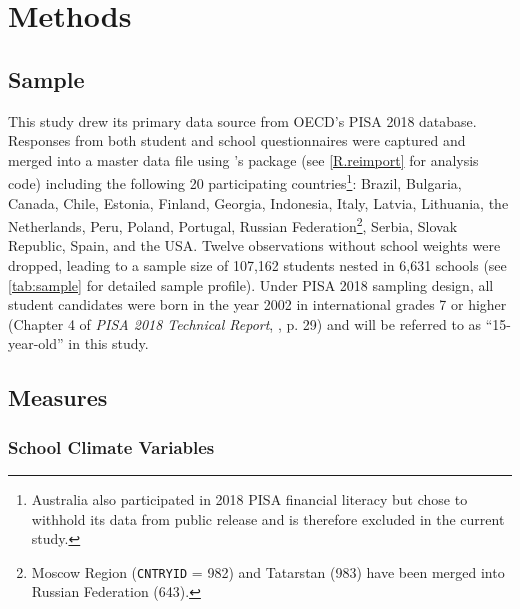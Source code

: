 \documentclass[a4paper,11pt,UKenglish,twoside,openright]{report}\usepackage[]{graphicx}\usepackage[]{color}
\begin{document}

\chapter{Methods}
\label{chp:3}

\section{Sample}

This study drew its primary data source from OECD's PISA 2018 database. Responses from both student \parencite{FLdata} and school questionnaires \parencite{SCHdata} were captured and merged into a master data file using \CR's \parencite[Version 4.0.5,][]{R}  package \parencite[Version 2.5,][]{intsvy} (see \cref{R.reimport} for analysis code) including the following 20 participating countries\footnote{Australia also participated in 2018 PISA financial literacy but chose to withhold its data from public release and is therefore excluded in the current study.}: Brazil, Bulgaria, Canada, Chile, Estonia, Finland, Georgia, Indonesia, Italy, Latvia, Lithuania, the Netherlands, Peru, Poland, Portugal, Russian Federation\footnote{Moscow Region (\texttt{CNTRYID} = 982) and Tatarstan (983) have been merged into Russian Federation (643).}, Serbia, Slovak Republic, Spain, and the USA. Twelve observations without school weights were dropped, leading to a sample size of 107,162 students nested in 6,631 schools (see \cref{tab:sample} for detailed sample profile). Under PISA 2018 sampling design, all student candidates were born in the year 2002 in international grades 7 or higher (Chapter 4 of \textit{PISA 2018 Technical Report}, \textcite{PISAtech}, p. 29) and will be referred to as ``15-year-old'' in this study.

\section{Measures}

\subsection{School Climate Variables}
\end{document}
